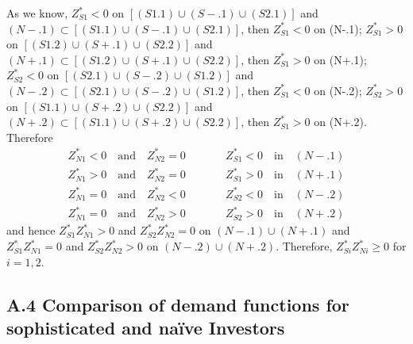 \documentclass[10pt]{article}
\begin{document}
As we know, 
$ Z_{S1}^* < 0 $ on $ [(S1.1) \cup (S-.1) \cup (S2.1)] $ and $ (N-.1) \subset [(S1.1) \cup (S-.1) \cup (S2.1)] $, then $ Z_{S1}^* < 0 $ on (N-.1); 
$ Z_{S1}^* > 0 $ on $ [(S1.2) \cup (S+.1) \cup (S2.2)] $ and $ (N+.1) \subset [(S1.2) \cup (S+.1) \cup (S2.2)] $, then $ Z_{S1}^* > 0 $ on (N+.1);
$ Z_{S2}^* < 0 $ on $ [(S2.1) \cup (S-.2) \cup (S1.2)] $ and $ (N-.2) \subset [(S2.1) \cup (S-.2) \cup (S1.2)] $, then $ Z_{S1}^* < 0 $ on (N-.2);
$ Z_{S2}^* > 0 $ on $ [(S1.1) \cup (S+.2) \cup (S2.2)] $ and $ (N+.2) \subset [(S1.1) \cup (S+.2) \cup (S2.2)] $, then $ Z_{S1}^* > 0 $ on (N+.2).
Therefore
\begin{eqnarray*}
Z_{N1}^* < 0 \quad \text{and} \quad Z_{N2}^* = 0 \quad & & \quad Z_{S1}^* < 0 \quad \text{in} \quad (N-.1) \\
Z_{N1}^* > 0 \quad \text{and} \quad Z_{N2}^* = 0 \quad & & \quad Z_{S1}^* > 0 \quad \text{in} \quad (N+.1) \\
Z_{N1}^* = 0 \quad \text{and} \quad Z_{N2}^* < 0 \quad & & \quad Z_{S2}^* < 0 \quad \text{in} \quad (N-.2) \\
Z_{N1}^* = 0 \quad \text{and} \quad Z_{N2}^* > 0 \quad & & \quad Z_{S2}^* > 0 \quad \text{in} \quad (N+.2)
\end{eqnarray*}
and hence $ Z_{S 1}^* Z_{N 1}^* > 0 $ and $ Z_{S 2}^* Z_{N 2}^* = 0 $ on $ (N-.1) \cup (N+.1) $ and $ Z_{S 1}^* Z_{N 1}^* = 0 $ and $ Z_{S 2}^* Z_{N 2}^* > 0 $ on $ (N-.2) \cup (N+.2) $.
Therefore, $ Z_{S i}^* Z_{N i}^* \geqslant 0 $ for $ i = 1, 2 $.


\subsection*{A.4 \quad Comparison of demand functions for sophisticated and na\"ive Investors}
\end{document}
